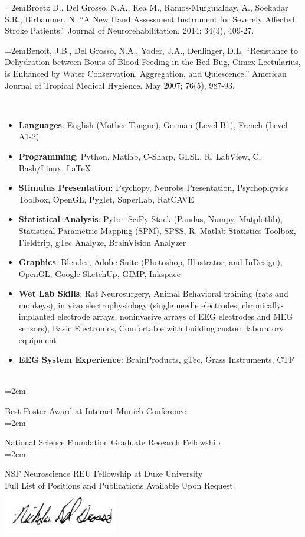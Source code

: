 \documentclass{article}
\newlength{\datebox}
\newcommand{\SubHeading}[1]{\vspace{1em}\noindent\spacedlowsmallcaps{#1}\vspace{0.7em}\\}
\newcommand{\MarginText}[1]{\marginpar{\raggedleft\small#1}}
\newcommand{\Description}[1]{\hangindent=2em\hangafter=0\footnotesize{#1}\par\normalsize\vspace{1em}}
\newcommand{\DescMarg}[2]{\noindent\hangindent=2em\hangafter=0 \parbox{\datebox}{\small} \MarginText{#1} #2 \vspace{0.3em}\\}
\begin{document}
\begin{cv}{}
\Description{Broetz D., Del Grosso, N.A., Rea M., Ramos{-}Murguialday, A., Soekadar S.R., Birbaumer, N. ``A New Hand Assessment Instrument for Severely Affected Stroke Patients.''  Journal of Neurorehabilitation. 2014; 34(3), 409{-}27.}
\Description{Benoit, J.B., Del Grosso, N.A., Yoder, J.A., Denlinger, D.L. ``Resistance to Dehydration between Bouts of Blood Feeding in the Bed Bug, Cimex Lectularius, is Enhanced by Water Conservation, Aggregation, and Quiescence.'' American Journal of Tropical Medical Hygience. May 2007; 76(5), 987{-}93.}
\SubHeading{Skills}
\begin{itemize}
\item
\textbf{Languages}: English (Mother Tongue), German (Level B1), French (Level A1-2)
\end{itemize}
\begin{itemize}
\item
\textbf{Programming}: Python, Matlab, C-Sharp, GLSL, R, LabView, C, Bash/Linux, LaTeX
\end{itemize}
\begin{itemize}
\item
\textbf{Stimulus Presentation}: Psychopy, Neurobs Presentation, Psychophysics Toolbox, OpenGL, Pyglet, SuperLab, RatCAVE
\end{itemize}
\begin{itemize}
\item
\textbf{Statistical Analysis}: Pyton SciPy Stack (Pandas, Numpy, Matplotlib), Statistical Parametric Mapping (SPM), SPSS, R, Matlab Statistics Toolbox, Fieldtrip, gTec Analyze, BrainVision Analyzer
\end{itemize}
\begin{itemize}
\item
\textbf{Graphics}: Blender, Adobe Suite (Photoshop, Illustrator, and InDesign), OpenGL, Google SketchUp, GIMP, Inkspace
\end{itemize}
\begin{itemize}
\item
\textbf{Wet Lab Skills}: Rat Neurosurgery, Animal Behavioral training (rats and monkeys), in vivo electrophysiology (single needle electrodes, chronically-implanted electrode arrays, noninvasive arrays of EEG electrodes and MEG sensors), Basic Electronics, Comfortable with building custom laboratory equipment
\end{itemize}
\begin{itemize}
\item
\textbf{EEG System Experience}: BrainProducts, gTec, Grass Instruments, CTF
\end{itemize}
\SubHeading{Awards}
\DescMarg{2015}{Best Poster Award at Interact Munich Conference}
\DescMarg{2011}{National Science Foundation Graduate Research Fellowship}
\DescMarg{2008}{NSF Neuroscience REU Fellowship at Duke University}
Full List of Positions and Publications Available Upon Request.
\includegraphics[width=5cm]{images/Signaturetransparant.png}
\end{cv}
\end{document}
